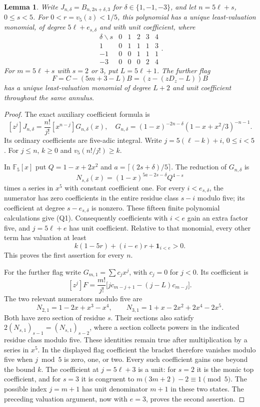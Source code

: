 \documentclass[11pt]{article}
\newtheorem{lemma}[theorem]{Lemma}
\begin{document}
\begin{lemma}\label{lem:quintic-annulus-flags}
Write $J_{n,\delta}=B_{n,2n+\delta,3}$ for
$\delta\in\{1,-1,-3\}$, and let $n=5\ell+s$, $0\le s<5$.
For $0<r=v_5(z)<1/5$, this polynomial has a unique
least-valuation monomial, of degree $5\ell+e_{s,\delta}$ and
with unit coefficient, where
\[
 \begin{array}{c|ccccc}
 \delta\backslash s&0&1&2&3&4\\\hline
 1&0&1&1&1&3\\
 -1&0&0&1&1&1\\
 -3&0&0&0&2&4
 \end{array} .                                           \tag{Q1}
\]
For $m=5\ell+s$ with $s=2$ or $3$, put $L=5\ell+1$.
The further flag
\[
 F=C-(5m+3-L)B=(z-(zD_z-L))B
\]
has a unique least-valuation monomial of degree $L+2$ and
unit coefficient throughout the same annulus.
\end{lemma}
\begin{proof}
The exact auxiliary coefficient formula is
\[
 [z^j]J_{n,\delta}
 =\frac{n!}{j!}[x^{n-j}]G_{n,\delta}(x),\quad
 G_{n,\delta}=(1-x)^{-2n-\delta}
             (1-x+x^2/3)^{-n-1}.
\]
Its ordinary coefficients are five-adic integral.
Write $j=5(\ell-k)+i$, $0\le i<5$.
For $j\le n$, $k\ge0$ and $v_5(n!/j!)\ge k$.

In $\mathbb F_5[x]$ put $Q=1-x+2x^2$ and
$a=\lceil(2s+\delta)/5\rceil$.
The reduction of $G_{n,\delta}$ is
\[
 N_{s,\delta}(x)=(1-x)^{5a-2s-\delta}Q^{4-s}
\]
times a series in $x^5$ with constant coefficient one.
For every $i<e_{s,\delta}$, the numerator has zero coefficients
in the entire residue class $s-i$ modulo five; its coefficient
at degree $s-e_{s,\delta}$ is nonzero.
These fifteen finite polynomial calculations give (Q1).
Consequently coefficients with $i<e$ gain an extra factor five,
and $j=5\ell+e$ has unit coefficient.
Relative to that monomial, every other term has valuation at least
\[
 k(1-5r)+(i-e)r+\mathbf1_{i<e}>0.
\]
This proves the first assertion for every $n$.

For the further flag write $G_{m,1}=\sum c_jx^j$, with
$c_j=0$ for $j<0$. Its coefficient is
\[
 [z^j]F=\frac{m!}{j!}
       \bigl[jc_{m-j+1}-(j-L)c_{m-j}\bigr].
\]
The two relevant numerators modulo five are
\[
 N_{2,1}=1-2x+x^3-x^4,\qquad
 N_{3,1}=1+x-2x^2+2x^4-2x^5.
\]
Both have zero section of residue $s$.
Their sections also satisfy
$2(N_{s,1})_{s-1}=(N_{s,1})_{s-2}$, where a section collects
powers in the indicated residue class modulo five.
These identities remain true after multiplication by a series
in $x^5$.
In the displayed flag coefficient the bracket therefore vanishes
modulo five when $j\bmod5$ is zero, one, or two.
Every such coefficient gains one beyond the bound $k$.
The coefficient at $j=5\ell+3$ is a unit:
for $s=2$ it is the monic top coefficient, and for $s=3$ it is
congruent to $m(3m+2)-2\equiv1\pmod5$.
The possible index $j=m+1$ has unit denominator $m+1$ in these
two states. The preceding valuation argument, now with $e=3$,
proves the second assertion.
\end{proof}
\end{document}

